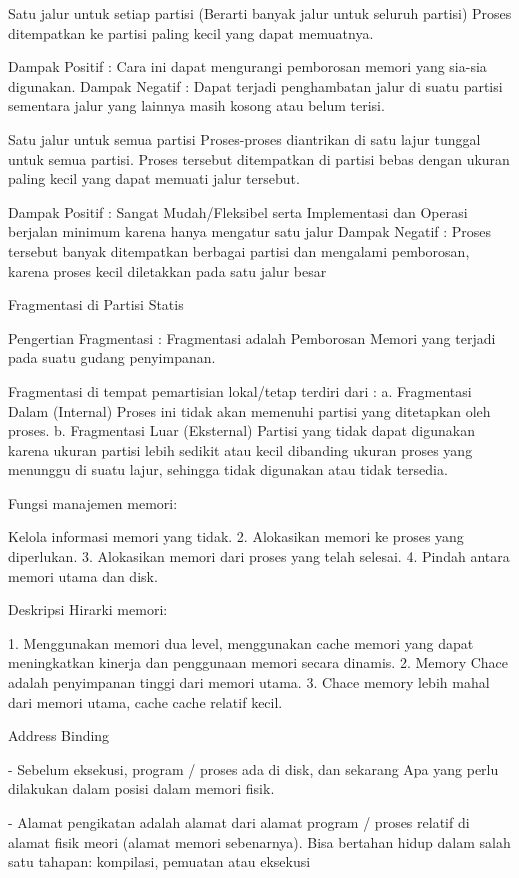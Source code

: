 Satu jalur untuk setiap partisi (Berarti banyak jalur untuk seluruh partisi) Proses ditempatkan ke partisi paling kecil yang dapat memuatnya.

Dampak Positif : Cara ini dapat mengurangi pemborosan memori yang sia-sia digunakan.
Dampak Negatif : Dapat terjadi penghambatan jalur di suatu partisi sementara jalur yang lainnya masih kosong atau belum terisi.

Satu jalur untuk semua partisi
Proses-proses diantrikan di satu lajur tunggal untuk semua partisi. Proses tersebut ditempatkan di partisi bebas dengan ukuran paling kecil
yang dapat memuati jalur tersebut.

Dampak Positif : Sangat Mudah/Fleksibel serta Implementasi dan Operasi berjalan minimum karena hanya mengatur satu jalur
Dampak Negatif : Proses tersebut banyak ditempatkan berbagai partisi dan mengalami pemborosan, karena proses kecil diletakkan pada satu jalur besar

Fragmentasi di Partisi Statis

Pengertian Fragmentasi :
Fragmentasi adalah Pemborosan Memori yang terjadi pada suatu gudang penyimpanan.

Fragmentasi di tempat pemartisian lokal/tetap terdiri dari :
a. Fragmentasi Dalam (Internal)
Proses ini tidak akan memenuhi partisi yang ditetapkan oleh proses.
b. Fragmentasi Luar (Eksternal)
Partisi yang tidak dapat digunakan karena ukuran partisi lebih sedikit atau kecil dibanding ukuran proses yang menunggu di suatu lajur,
sehingga tidak digunakan atau tidak tersedia.

Fungsi manajemen memori:

Kelola informasi memori yang tidak.
2. Alokasikan memori ke proses yang diperlukan.
3. Alokasikan memori dari proses yang telah selesai.
4. Pindah antara memori utama dan disk.

Deskripsi Hirarki memori:

1. Menggunakan memori dua level, menggunakan cache memori yang dapat meningkatkan kinerja dan penggunaan memori secara dinamis.
2. Memory Chace adalah penyimpanan tinggi dari memori utama.
3. Chace memory lebih mahal dari memori utama, cache cache relatif kecil.


Address Binding

- Sebelum eksekusi, program / proses ada di disk, dan sekarang
Apa yang perlu dilakukan dalam posisi dalam memori fisik.

- Alamat pengikatan adalah alamat dari alamat program / proses relatif
di alamat fisik meori (alamat memori sebenarnya). Bisa bertahan hidup
dalam salah satu tahapan: kompilasi, pemuatan atau eksekusi

